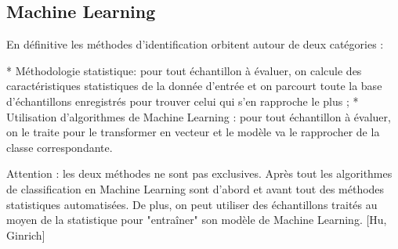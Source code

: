 \subsection{Machine Learning}

En définitive les méthodes d'identification orbitent autour de deux catégories :

* Méthodologie statistique: pour tout échantillon à évaluer, on calcule des
caractéristiques statistiques de la donnée d'entrée et on parcourt toute la base
d'échantillons enregistrés pour trouver celui qui s'en rapproche le plus ;
* Utilisation d'algorithmes de Machine Learning : pour tout échantillon à
évaluer, on le traite pour le transformer en vecteur et le modèle va le
rapprocher de la classe correspondante.

Attention : les deux méthodes ne sont pas exclusives. Après tout les algorithmes
de classification en Machine Learning sont d'abord et avant tout des méthodes
statistiques automatisées. De plus, on peut utiliser des échantillons traités au
moyen de la statistique pour "entraîner" son modèle de Machine Learning.
[Hu, Ginrich]